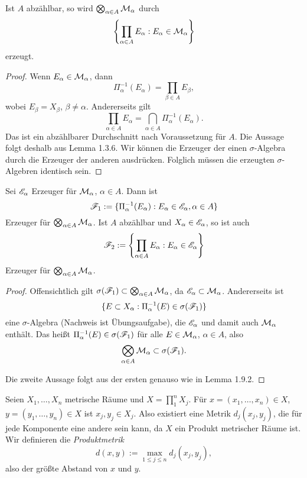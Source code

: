 \begin{lem}
 Ist $A$ abzählbar, so wird $\bigotimes_{\alpha \in A} \mathcal{M}_\alpha$ durch
 \[ \left\{ \prod_{\alpha \in A} E_\alpha : E_\alpha \in \mathcal{M}_\alpha \right\} \]
 erzeugt.
\end{lem}

\begin{proof}
 Wenn $E_\alpha \in \mathcal{M}_\alpha$, dann 
 \[ \Pi_\alpha^{-1}(E_\alpha) = \prod_{\beta \in A} E_\beta, \]
 wobei $E_\beta = X_\beta$, $\beta \ne \alpha$. Andererseits gilt
 \[ \prod_{\alpha \in A} E_\alpha = \bigcap_{\alpha \in A} \Pi^{-1}_\alpha (E_\alpha). \]
 Das ist ein abzählbarer Durchschnitt nach Voraussetzung für $A$. Die Aussage folgt deshalb aus Lemma 1.3.6. Wir können die Erzeuger der einen $\sigma$-Algebra durch die Erzeuger der anderen ausdrücken. Folglich müssen die erzeugten $\sigma$-Algebren identisch sein.
\end{proof}

\begin{lem}
 Sei $\mathscr{E}_\alpha$ Erzeuger für $\mathcal{M}_\alpha$, $\alpha \in A$. Dann ist
 \[ \mathscr{F}_1 := \{ \Pi_\alpha^{-1} (E_\alpha) : E_\alpha \in \mathscr{E}_\alpha, \alpha \in A \} \]
 Erzeuger für $\bigotimes_{\alpha \in A} \mathcal{M}_\alpha$. Ist $A$ abzählbar und $X_\alpha \in \mathscr{E}_\alpha$, so ist auch
 \[ \mathscr{F}_2 := \left\{ \prod_{\alpha \in A} E_\alpha : E_\alpha \in \mathscr{E}_\alpha \right\} \]
 Erzeuger für $\bigotimes_{\alpha \in A} \mathcal{M}_\alpha$.
\end{lem}

\begin{proof}
 Offensichtlich gilt $\sigma(\mathscr{F}_1) \subset \bigotimes_{\alpha \in A} \mathcal{M}_\alpha$, da $\mathscr{E}_\alpha \subset \mathcal{M}_\alpha$. Andererseits ist 
 \[ \{ E \subset X_\alpha : \Pi_\alpha^{-1} (E) \in \sigma( \mathscr{F}_1 ) \} \]
 eine $\sigma$-Algebra (Nachweis ist Übungsaufgabe), die $\mathscr{E}_\alpha$ und damit auch $\mathcal{M}_\alpha$ enthält. Das heißt $\Pi_\alpha^{-1}( E ) \in \sigma ( \mathscr{F}_1 )$ für alle $E \in \mathcal{M}_\alpha$, $\alpha \in A$, also
 \[ \bigotimes_{\alpha \in A} \mathcal{M}_\alpha \subset \sigma ( \mathscr{F}_1 ). \]
 
 Die zweite Aussage folgt aus der ersten genauso wie in Lemma 1.9.2.
\end{proof}

\begin{defn*}
 Seien $X_1, \ldots, X_n$ metrische Räume und $X = \prod_1^n X_j$. Für $x = (x_1, \ldots, x_n) \in X$, $y = (y_1, \ldots, y_n) \in X$ ist $x_j, y_j \in X_j$. Also existiert eine Metrik $d_j(x_j,y_j)$, die für jede Komponente eine andere sein kann, da $X$ ein Produkt metrischer Räume ist. Wir definieren die \emph{Produktmetrik}
 \[ d(x,y) := \max_{1 \le j \le n} d_j(x_j,y_j), \]
 also der größte Abstand von $x$ und $y$.
\end{defn*}
 
